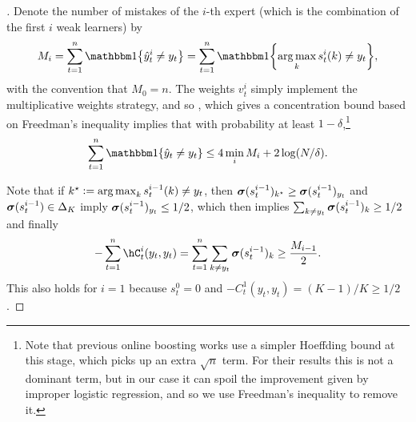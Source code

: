 \begin{proof}[] 
Denote the number of mistakes of the $i$-th expert (which is the combination of the first $i$ weak learners) by
\[
M_{i} = \sum_{t=1}^{n}\ind\crl*{\yh_{t}^{i}\neq{}y_t}=\sum_{t=1}^{n}\ind\crl*{\argmax_{k}s_{t}^{i}(k)\neq{}y_t},
\]
with the convention that $M_{0}=n$. The weights $v_{t}^{i}$ simply implement the multiplicative weights strategy, and so , which gives a concentration bound based on Freedman's inequality implies that with probability at least $1-\delta$,\footnote{%
Note that previous online boosting works \citep{beygelzimer2015optimal,jung2017onlinemulticlass} use a simpler Hoeffding bound at this stage, which picks up an extra $\sqrt{n}$ term. For their results this is not a dominant term, but in our case it can spoil the improvement given by improper logistic regression, and so we use Freedman's inequality to remove it.
}
\begin{equation}
\label{eq:multiplicative_weights_bound}
\sum_{t=1}^{n}\ind\crl*{\yh_{t}\neq{}y_t} \leq{} 4\min_{i}M_{i} + 2\log(N/\delta).
\end{equation}

Note that if $k^{\star}\vcentcolon=\operatorname*{arg\,max}_{k}s_{t}^{i-1}(k)\neq{}y_t$, then $\boldsymbol{\sigma}(s_{t}^{i-1})_{k^{\star}}\geq{}\boldsymbol{\sigma}(s_{t}^{i-1})_{y_t}$ and $\boldsymbol{\sigma}(s_{t}^{i-1})\in\Delta_{K}$ imply $\boldsymbol{\sigma}(s_{t}^{i-1})_{y_t}\leq{}1/2$, which then implies $\sum_{k\neq{}y_t}\boldsymbol{\sigma}(s_{t}^{i-1})_{k}\geq{}1/2$ and finally
\begin{equation}
\label{eq:cost_matrix_mistakes}
-\sum_{t=1}^{n}\hC_{t}^{i}(y_t, y_t) = \sum_{t=1}^n\sum_{k\neq{}y_t}\mb{\sigma}(s_{t}^{i-1})_{k} \geq{} \frac{M_{i-1}}{2}.
\end{equation}
This also holds for $i=1$ because $s_{t}^{0}=0$ and $-C_{t}^{1}(y_t, y_t)=(K-1)/K\geq{}1/2$.


\end{proof}
